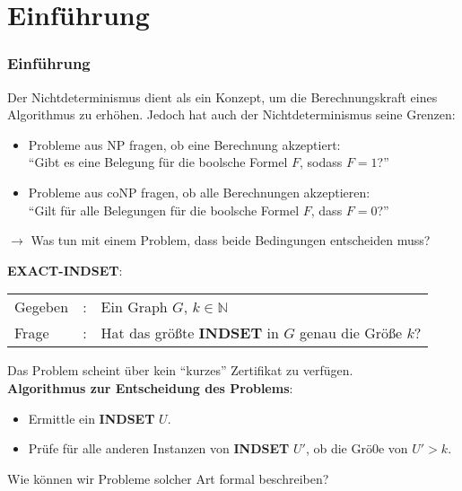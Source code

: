 \section{Einführung}

\begin{frame}
    \frametitle{Einführung}
    Der Nichtdeterminismus dient als ein Konzept, um die Berechnungskraft eines Algorithmus zu erhöhen.
    Jedoch hat auch der Nichtdeterminismus seine Grenzen:
    \begin{itemize}
        \item Probleme aus NP fragen, ob eine Berechnung akzeptiert: \\
         \enquote{Gibt es eine Belegung für die boolsche Formel $F$, sodass $F = 1$?}
        \item Probleme aus coNP fragen, ob alle Berechnungen akzeptieren: \\
          \enquote{Gilt für alle Belegungen für die boolsche Formel $F$, dass $F = 0$?}
    \end{itemize}
    $\rightarrow$ Was tun mit einem Problem, dass beide Bedingungen entscheiden muss?
\end{frame}


 \begin{frame}
    \begin{block}{\textbf{EXACT-INDSET}:}
        \begin{tabular}{@{}l@{}cl}
        Gegeben &:& Ein Graph $G$, $k \in \mathbb{N}$\\ 
        Frage &:& Hat das größte \textbf{INDSET} in $G$ genau die Größe $k$?
        \end{tabular}
    \end{block}

    Das Problem scheint über kein \enquote{kurzes} Zertifikat zu verfügen. \\
    \textbf{Algorithmus zur Entscheidung des Problems}:
    \begin{itemize}
        \item Ermittle ein \textbf{INDSET} $U$.
        \item Prüfe für alle anderen Instanzen von \textbf{INDSET} $U'$, ob die Grö0e von $U' > k$.
    \end{itemize}
     Wie können wir Probleme solcher Art formal beschreiben?
 \end{frame}